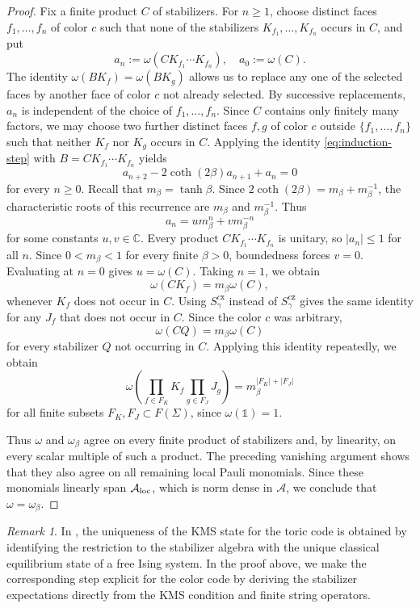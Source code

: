 \documentclass[a4paper,11pt]{article}
\theoremstyle{definition}
\theoremstyle{remark}
\newtheorem{remark}{Remark}[section]
\theoremstyle{remark}
\begin{document}
\begin{proof}
    Fix a finite product $C$ of stabilizers. For $n\geq1$, choose distinct faces $f_1,\ldots,f_n$ of color $c$ such that none of the stabilizers $K_{f_1},\ldots,K_{f_n}$ occurs in $C$, and put
    \[
        a_n:=\omega(CK_{f_1}\cdots K_{f_n}), \quad a_0:=\omega(C). 
    \]
    The identity $\omega(BK_f)=\omega(BK_g)$ allows us to replace any one of the selected faces by another face of color $c$ not already selected. By successive replacements, $a_n$ is independent of the choice of $f_1,\ldots,f_n$. Since $C$ contains only finitely many factors, we may choose two further distinct faces $f,g$ of color $c$ outside $\{f_1,\ldots,f_n\}$ such that neither $K_f$ nor $K_g$ occurs in $C$. Applying the identity \eqref{eq:induction-step} with $B=CK_{f_1}\cdots K_{f_n}$ yields 
    \[
        a_{n+2}-2\coth(2\beta)a_{n+1}+a_n=0
    \]
    for every $n\geq0$. Recall that $m_\beta=\tanh\beta$. Since $2\coth(2\beta)=m_\beta+m_\beta^{-1}$, the characteristic roots of this recurrence are $m_\beta$ and $m_\beta^{-1}$. Thus 
    \[
        a_n=um_\beta^n+vm_\beta^{-n}
    \]
    for some constants $u,v\in\mathbb C$. Every product $CK_{f_1}\cdots K_{f_n}$ is unitary, so $|a_n|\leq1$ for all $n$. Since $0<m_\beta<1$ for every finite $\beta>0$, boundedness forces $v=0$. Evaluating at $n=0$ gives $u=\omega(C)$. Taking $n=1$, we obtain 
    \[
        \omega(CK_f)=m_\beta\omega(C),
    \]
    whenever $K_f$ does not occur in $C$. Using $S_\gamma^{c\mathtt x}$ instead of $S_\gamma^{c\mathtt z}$ gives the same identity for any $J_f$ that does not occur in $C$. Since the color $c$ was arbitrary, 
    \[
        \omega(CQ)=m_\beta\omega(C)
    \]
    for every stabilizer $Q$ not occurring in $C$. Applying this identity repeatedly, we obtain
    \[
        \omega\left(\prod_{f\in F_K}K_f\prod_{g\in F_J}J_g\right)=m_\beta^{|F_K|+|F_J|}
    \]
    for all finite subsets $F_K,F_J\subset F(\Sigma)$, since $\omega(\mathds{1})=1$.
    
    Thus $\omega$ and $\omega_\beta$ agree on every finite product of stabilizers and, by linearity, on every scalar multiple of such a product. The preceding vanishing argument shows that they also agree on all remaining local Pauli monomials. Since these monomials linearly span $\mathcal A_{\rm loc}$, which is norm dense in $\mathcal A$, we conclude that $\omega=\omega_\beta$.
\end{proof}

\begin{remark}
    In \cite[Section~2.2.2]{alicki2007statistical}, the uniqueness of the KMS state for the toric code is obtained by identifying the restriction to the stabilizer algebra with the unique classical equilibrium state of a free Ising system. In the proof above, we make the corresponding step explicit for the color code by deriving the stabilizer expectations directly from the KMS condition and finite string operators.
\end{remark}
\end{document}
